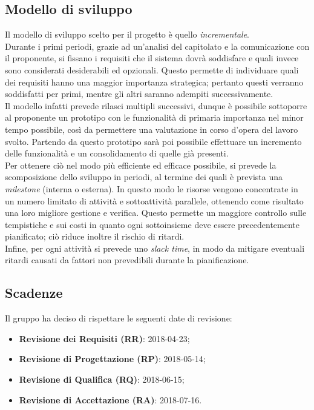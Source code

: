 \subsection{Modello di sviluppo}
Il modello di sviluppo scelto per il progetto è quello \emph{incrementale}.\\
Durante i primi periodi, grazie ad un'analisi del capitolato e la comunicazione con il proponente, si fissano i requisiti che il sistema dovrà soddisfare e quali invece sono considerati desiderabili ed opzionali. Questo permette di individuare quali dei requisiti hanno una maggior importanza strategica; pertanto questi verranno soddisfatti per primi, mentre gli altri saranno adempiti successivamente.\\
Il modello infatti prevede rilasci multipli successivi, dunque è possibile sottoporre al proponente un prototipo con le funzionalità di primaria importanza nel minor tempo possibile, così da permettere una valutazione in corso d’opera del lavoro svolto. Partendo da questo prototipo sarà poi possibile effettuare un incremento delle funzionalità e un consolidamento di quelle già presenti.\\
Per ottenere ciò nel modo più efficiente ed efficace possibile, si prevede la scomposizione dello sviluppo in periodi, al termine dei quali è prevista una \emph{milestone} (interna o esterna). In questo modo le risorse vengono concentrate in un numero limitato di attività e sottoattività parallele, ottenendo come risultato una loro migliore gestione e verifica.
Questo permette un maggiore controllo sulle tempistiche e sui costi in quanto ogni sottoinsieme deve essere precedentemente pianificato; ciò riduce inoltre il rischio di ritardi.\\
Infine, per ogni attività si prevede uno \emph{slack time}, in modo da mitigare eventuali ritardi causati da fattori non prevedibili durante la pianificazione.

\subsection{Scadenze}\label{Scadenze}
Il gruppo \Gruppo{} ha deciso di rispettare le seguenti date di revisione:
\begin{itemize}
	\item \textbf{Revisione dei Requisiti (RR)}: 2018-04-23;
	\item \textbf{Revisione di Progettazione (RP)}: 2018-05-14;
	\item \textbf{Revisione di Qualifica (RQ)}: 2018-06-15;
	\item \textbf{Revisione di Accettazione (RA)}: 2018-07-16.
\end{itemize}
